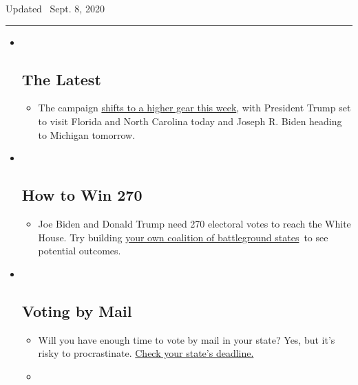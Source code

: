 Updated ~Sept. 8, 2020

\begin{center}\rule{0.5\linewidth}{\linethickness}\end{center}

\begin{itemize}
\item ~
  \hypertarget{the-latest}{%
  \subsection{The Latest}\label{the-latest}}

  \begin{itemize}
  \item
    The campaign
    \href{https://www.nytimes3xbfgragh.onion/live/2020/09/08/us/trump-vs-biden?action=click\&pgtype=Article\&state=default\&region=BELOW_MAIN_CONTENT\&context=storylines_guide}{shifts
    to a higher gear this week}, with President Trump set to visit
    Florida and North Carolina today and Joseph R. Biden heading to
    Michigan tomorrow.
  \end{itemize}
\item ~
  \hypertarget{how-to-win-270}{%
  \subsection{How to Win 270}\label{how-to-win-270}}

  \begin{itemize}
  \item
    Joe Biden and Donald Trump need 270 electoral votes to reach the
    White House. Try building
    \href{https://www.nytimes3xbfgragh.onion/interactive/2020/us/elections/election-states-biden-trump.html?action=click\&pgtype=Article\&state=default\&region=BELOW_MAIN_CONTENT\&context=storylines_guide}{your
    own coalition of battleground states}~to see potential outcomes.
  \end{itemize}
\item ~
  \hypertarget{voting-by-mail}{%
  \subsection{Voting by Mail}\label{voting-by-mail}}

  \begin{itemize}
  \item
    Will you have enough time to vote by mail in your state? Yes, but
    it's risky to procrastinate.
    \href{https://www.nytimes3xbfgragh.onion/interactive/2020/08/31/us/politics/vote-by-mail-deadlines.html?action=click\&pgtype=Article\&state=default\&region=BELOW_MAIN_CONTENT\&context=storylines_guide}{Check
    your state's deadline.}
  \item
    \href{https://www.nytimes3xbfgragh.onion/interactive/2020/us/elections/joe-biden.html?action=click\&pgtype=Article\&state=default\&region=BELOW_MAIN_CONTENT\&context=storylines_guide}{}


\end{itemize}
\end{itemize}
